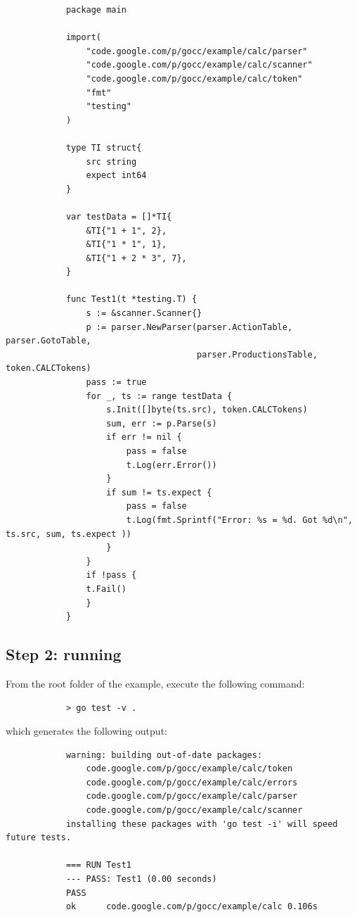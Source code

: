 \documentclass[12pt]{article}
\begin{document}
		\begin{verbatim}
			package main

			import(
			    "code.google.com/p/gocc/example/calc/parser"
			    "code.google.com/p/gocc/example/calc/scanner"
			    "code.google.com/p/gocc/example/calc/token"
			    "fmt"
			    "testing"
			)

			type TI struct{
			    src string
			    expect int64
			}

			var testData = []*TI{
			    &TI{"1 + 1", 2},
			    &TI{"1 * 1", 1},
			    &TI{"1 + 2 * 3", 7},
			}

			func Test1(t *testing.T) {
			    s := &scanner.Scanner{}
			    p := parser.NewParser(parser.ActionTable, parser.GotoTable, 
			                          parser.ProductionsTable, token.CALCTokens)
			    pass := true
			    for _, ts := range testData {
			        s.Init([]byte(ts.src), token.CALCTokens)
			        sum, err := p.Parse(s)
			        if err != nil {
			            pass = false
			            t.Log(err.Error())
			        }
			        if sum != ts.expect {
			            pass = false
			            t.Log(fmt.Sprintf("Error: %s = %d. Got %d\n", ts.src, sum, ts.expect ))
			        }
			    }
			    if !pass {
			    t.Fail()
			    }
			}

		\end{verbatim}

	\subsection{Step 2: running }
		From the root folder of the  example, execute the following command:

		\begin{verbatim}
			> go test -v .
		\end{verbatim}

		which generates the following output:

		\begin{verbatim}
			warning: building out-of-date packages:
			    code.google.com/p/gocc/example/calc/token
			    code.google.com/p/gocc/example/calc/errors
			    code.google.com/p/gocc/example/calc/parser
			    code.google.com/p/gocc/example/calc/scanner
			installing these packages with 'go test -i' will speed future tests.

			=== RUN Test1
			--- PASS: Test1 (0.00 seconds)
			PASS
			ok  	code.google.com/p/gocc/example/calc	0.106s		\end{verbatim}
\end{document}
